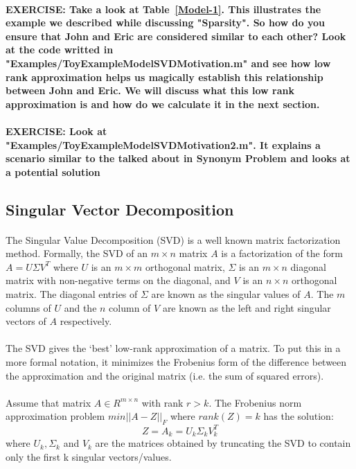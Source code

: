 \documentclass{article}
\begin{document}
\\
{\color{blue}\textbf{EXERCISE: Take a look at Table~\ref{Model-1}. This illustrates the example we described while discussing "Sparsity". So how do you ensure that John and Eric are considered similar to each other? Look at the code writted in "Examples/ToyExampleModelSVDMotivation.m" and see how low rank approximation helps us magically establish this relationship between John and Eric. We will discuss what this low rank approximation is and how do we calculate it in the next section. }}
\\
\\
{\color{blue}\textbf{EXERCISE: Look at "Examples/ToyExampleModelSVDMotivation2.m". It explains a scenario similar to the talked about in Synonym Problem and looks at a potential solution }}
  \subsection{Singular Vector Decomposition}
\paragraph{}
The Singular Value Decomposition (SVD) is a well known matrix factorization method. Formally, the SVD of an $m \times n$ matrix $A$ is a factorization of the form $A = U \Sigma V^{T}$ where $U$ is an $m \times m$ orthogonal matrix, $\Sigma$ is an $m \times n$ diagonal matrix with non-negative terms on the diagonal, and $V$ is an $n \times n$ orthogonal matrix. The diagonal entries of $\Sigma$ are known as the singular values of $A$. The $m$ columns of $U$ and the $n$ column of $V$ are known as the left and right singular vectors of $A$ respectively.
\paragraph{}
The SVD gives the `best' low-rank approximation of a matrix. To put this in a more formal notation, it minimizes the Frobenius form of the difference between the approximation and the original matrix (i.e. the sum of squared errors).
\paragraph{}
Assume that matrix $A \in R^{m \times n}$ with rank $r > k$. The Frobenius norm approximation problem $min || A - Z ||_{F}$ where $rank(Z) = k$ has the solution:
\[Z = A_{k} = U_{k} \Sigma_{k} V_{k}^{T}\]
where $U_{k}, \Sigma_{k}$ and $V_{k}$ are the matrices obtained by truncating the SVD to contain only the first k singular vectors/values.
\end{document}
